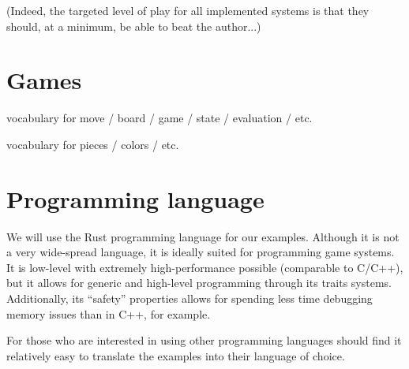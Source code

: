 \documentclass[10pt,dvipdfmx]{report}
\begin{document}
(Indeed, the targeted level of play for all implemented systems is that they should, at a minimum,
be able to beat the author...)

\section{Games}

vocabulary for move / board / game / state / evaluation / etc.

vocabulary for pieces / colors / etc.

\section{Programming language}

We will use the Rust programming language for our examples.
Although it is not a very wide-spread language, it is ideally suited for
programming game systems.  It is low-level with extremely high-performance possible (comparable to C/C++),
but it allows for generic and high-level programming through its traits systems.  Additionally, its ``safety''
properties allows for spending less time debugging memory issues than in C++, for example.

For those who are interested in using other programming languages should find it relatively easy to translate
the examples into their language of choice.

\makeatletter
\newcount\ttt@x
\newcount\ttt@y
\newcommand{\ttt@putrow}[1]{\@for\tmp:=#1\do{\put(\ttt@x,\ttt@y){\makebox(5,5){\tmp}}\advance\ttt@x by 5}}
\newcommand{\tictactoeboard}[3]{{
\setlength{\unitlength}{1mm}
\begin{picture}(15,15)(0,0)
\thicklines
\put(0,5){\line(1,0){15}}
\put(0,10){\line(1,0){15}}
\put(5,0){\line(0,1){15}}
\put(10,0){\line(0,1){15}}
\ttt@x=0\ttt@y=10\ttt@putrow{#1}
\ttt@x=0\ttt@y=5\ttt@putrow{#2}
\ttt@x=0\ttt@y=0\ttt@putrow{#3}
\end{picture}
}}
\makeatother
\end{document}
